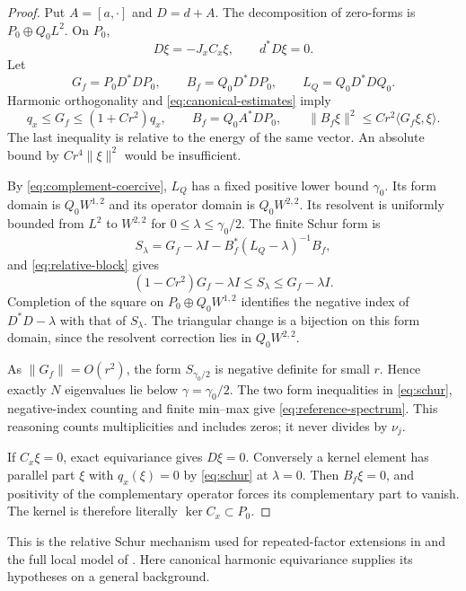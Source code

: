 \begin{proof}
Put $A=[a,\cdot]$ and $D=d+A$. The decomposition of zero-forms is
$P_0\oplus Q_0L^2$. On $P_0$,
\[
 D\xi=-J_xC_x\xi,\qquad d^*D\xi=0.
\]
Let
\[
 G_f=P_0D^*DP_0,\qquad B_f=Q_0D^*DP_0,\qquad
 L_Q=Q_0D^*DQ_0 .
\]
Harmonic orthogonality and \eqref{eq:canonical-estimates} imply
\begin{equation}\label{eq:relative-block}
 q_x\le G_f\le(1+Cr^2)q_x,\qquad
 B_f=Q_0A^*DP_0,\qquad
 \|B_f\xi\|^2\le Cr^2\langle G_f\xi,\xi\rangle .
\end{equation}
The last inequality is relative to the energy of the same vector.
An absolute bound by $Cr^4\|\xi\|^2$ would be insufficient.

By \eqref{eq:complement-coercive}, $L_Q$ has a fixed positive
lower bound $\gamma_0$. Its form domain is $Q_0W^{1,2}$ and its
operator domain is $Q_0W^{2,2}$. Its resolvent is uniformly bounded
from $L^2$ to $W^{2,2}$ for $0\le\lambda\le\gamma_0/2$.
The finite Schur form is
\[
 S_\lambda=G_f-\lambda I
              -B_f^*(L_Q-\lambda)^{-1}B_f,
\]
and \eqref{eq:relative-block} gives
\begin{equation}\label{eq:schur}
 (1-Cr^2)G_f-\lambda I\le S_\lambda\le G_f-\lambda I .
\end{equation}
Completion of the square on $P_0\oplus Q_0W^{1,2}$ identifies the
negative index of $D^*D-\lambda$ with that of $S_\lambda$.
The triangular change is a bijection on this form domain, since the
resolvent correction lies in $Q_0W^{2,2}$.

As $\|G_f\|=O(r^2)$, the form $S_{\gamma_0/2}$ is negative
definite for small $r$. Hence exactly $N$ eigenvalues lie below
$\gamma=\gamma_0/2$. The two form inequalities in \eqref{eq:schur},
negative-index counting and finite min--max give
\eqref{eq:reference-spectrum}. This reasoning counts multiplicities
and includes zeros; it never divides by $\nu_j$.

If $C_x\xi=0$, exact equivariance gives $D\xi=0$.
Conversely a kernel element has parallel part $\xi$ with $q_x(\xi)=0$
by \eqref{eq:schur} at $\lambda=0$. Then $B_f\xi=0$, and positivity
of the complementary operator forces its complementary part to vanish.
The kernel is therefore literally $\ker C_x\subset P_0$.
\end{proof}

This is the relative Schur mechanism used for repeated-factor
extensions in \cite[Section~5]{wuebben4} and the full local model
of \cite[Section~5]{wuebben7}. Here canonical harmonic equivariance
supplies its hypotheses on a general background.

